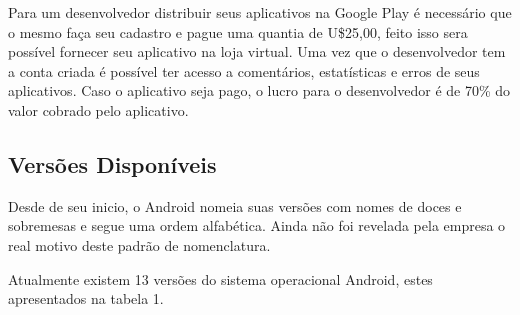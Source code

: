 Para um desenvolvedor distribuir seus aplicativos na Google Play é necessário que o mesmo faça seu cadastro e pague uma quantia de U\$25,00, feito isso
sera possível fornecer seu aplicativo na loja virtual.
Uma vez que o desenvolvedor tem a conta criada é possível ter acesso a comentários, estatísticas e erros de seus aplicativos. Caso o aplicativo seja pago, o lucro para o desenvolvedor é de 70\% do valor cobrado pelo aplicativo. \cite{tt}

\subsection{Versões Disponíveis}

Desde de seu inicio, o Android nomeia suas versões com nomes de doces e sobremesas e segue uma ordem alfabética. Ainda não foi revelada pela empresa o real motivo deste padrão de nomenclatura.

Atualmente existem 13 versões do sistema operacional Android, estes apresentados na tabela 1. \cite{vs}

\begin{table}[h!]
\end{table}
\pagebreak
